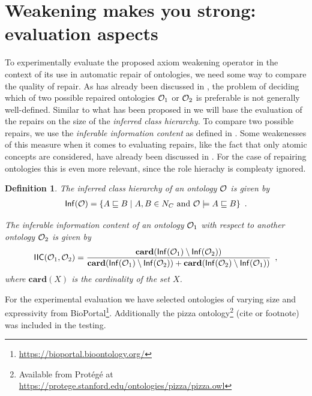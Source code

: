 \documentclass[
]{ceurart}
\newtheorem{definition}{Definition}
\begin{document}
\section{Weakening makes you strong: evaluation aspects}

To experimentally evaluate the proposed axiom weakening operator in the context of its use in automatic repair of ontologies, we need some way to compare the quality of repair. As has already been discussed in \cite{troquard2018repairing}, the problem of deciding which of two possible repaired ontologies $\mathcal{O}_1$ or $\mathcal{O}_2$ is preferable is not generally well-defined. Similar to what has been proposed in \cite{troquard2018repairing} we will base the evaluation of the repairs on the size of the \emph{inferred class hierarchy}. To compare two possible repairs, we use the \emph{inferable information content} as defined in \cite{troquard2018repairing}. Some weakenesses of this measure when it comes to evaluating repairs, like the fact that only atomic concepts are considered, have already been discussed in \cite{troquard2018repairing}. For the case of repairing \SROIQ ontologies this is even more relevant, since the role hierachy is compleaty ignored.

\begin{definition}
  The \emph{inferred class hierarchy} of an ontology $\mathcal{O}$ is given by
  \begin{align*}
    {\ensuremath{\mathsf{Inf}}}(\mathcal{O}) = \{ A \sqsubseteq B \mid A, B \in N_C \text{ and } \mathcal{O} \models A \sqsubseteq B \} \enspace.
  \end{align*}

  The \emph{inferable information content} of an ontology $\mathcal{O}_1$ with respect to another ontology $\mathcal{O}_2$ is given by
  \begin{align*}
    {\ensuremath{\mathsf{IIC}}}(\mathcal{O}_1, \mathcal{O}_2) = \frac{\mathbf{card}({\mathsf{Inf}}(\mathcal{O}_1) \setminus {\ensuremath{\mathsf{Inf}}}(\mathcal{O}_2))}{\mathbf{card}({\mathsf{Inf}}(\mathcal{O}_1) \setminus {\ensuremath{\mathsf{Inf}}}(\mathcal{O}_2)) + \mathbf{card}({\mathsf{Inf}}(\mathcal{O}_2) \setminus {\ensuremath{\mathsf{Inf}}}(\mathcal{O}_1))} \enspace,
  \end{align*}
  where $\mathbf{card}(X)$ is the cardinality of the set $X$.
\end{definition}


For the experimental evaluation we have selected ontologies of varying size and expressivity from BioPortal\footnote{\url{https://bioportal.bioontology.org/}}. Additionally the pizza ontology\footnote{Available from Protégé at \url{https://protege.stanford.edu/ontologies/pizza/pizza.owl}} (cite or footnote) was included in the testing.
\end{document}
